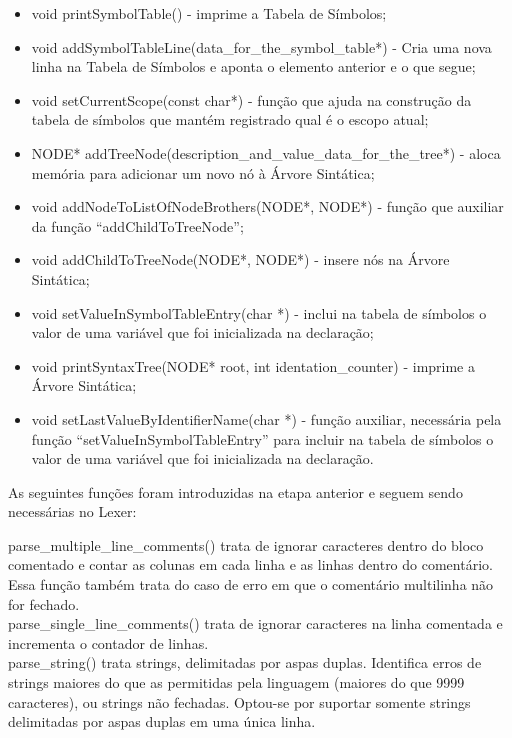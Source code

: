 \documentclass[12pt]{article}
\begin{document}
\begin{itemize}
	\item void printSymbolTable() - imprime a Tabela de Símbolos;
    \item void addSymbolTableLine(data\_for\_the\_symbol\_table*) - Cria uma nova linha na Tabela de Símbolos e aponta o elemento anterior e o que segue;
    \item void setCurrentScope(const char*) - função que ajuda na construção da tabela de símbolos que mantém registrado qual é o escopo atual;
    \item NODE* addTreeNode(description\_and\_value\_data\_for\_the\_tree*) - aloca memória para adicionar um novo nó à Árvore Sintática;
    \item void addNodeToListOfNodeBrothers(NODE*, NODE*) - função que auxiliar da função ``addChildToTreeNode'';
    \item void addChildToTreeNode(NODE*, NODE*) - insere nós na Árvore Sintática;
    \item void setValueInSymbolTableEntry(char *) - inclui na tabela de símbolos o valor de uma variável que foi inicializada na declaração;
	\item void printSyntaxTree(NODE* root, int identation\_counter) - imprime a Árvore Sintática;
	\item void setLastValueByIdentifierName(char *) - função auxiliar, necessária pela função ``setValueInSymbolTableEntry'' para incluir na tabela de símbolos o valor de uma variável que foi inicializada na declaração.\\
\end{itemize}

As seguintes funções foram introduzidas na etapa anterior e seguem sendo necessárias no Lexer:

parse\_multiple\_line\_comments() trata de ignorar caracteres dentro do bloco comentado e contar as colunas em cada linha e as linhas dentro do comentário. Essa função também trata do caso de erro em que o comentário multilinha não for fechado.\\

parse\_single\_line\_comments() trata de ignorar caracteres na linha comentada e incrementa o contador de linhas.\\

parse\_string() trata strings, delimitadas por aspas duplas. Identifica erros de strings maiores do que as permitidas pela linguagem (maiores do que 9999 caracteres), ou strings não fechadas. Optou-se por suportar somente strings delimitadas por aspas duplas em uma única linha.
\end{document}
